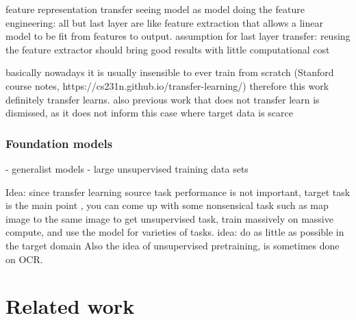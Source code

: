 \documentclass{article}
\begin{document}
feature representation transfer
seeing model as model doing the feature engineering: all but last layer are like 
feature extraction that allows a linear model to be fit from features to output. 
assumption for last layer transfer: reusing the feature extractor should bring good results with little computational cost

basically nowadays it is usually insensible to ever train from scratch (Stanford course notes, https://cs231n.github.io/transfer-learning/)
therefore this work definitely transfer learns. also previous work that does not transfer learn is dismissed, 
as it does not inform this case where target data is scarce

\subsubsection{Foundation models}

- generalist models
	- large unsupervised training data sets

Idea: since transfer learning source task performance is not important, target task is the main point \cite{transferlearning_survey}, 
you can come up with some nonsensical task such as map image to the same image to get unsupervised task, train 
massively on massive compute, and use the model for varieties of tasks. idea: do as little as possible in the target domain
Also the idea of unsupervised pretraining, is sometimes done on OCR.


\section{Related work}
\end{document}
